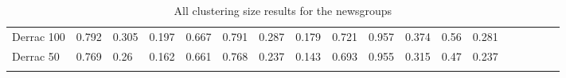 \begin{landscape}
\begin{table}[]
\begin{tabular}{lll@{\hskip 0.15in}lllllllllllllll}
		Derrac 100  & 0.792                           & 0.305                           & 0.197                           & 0.667                           & 0.791                           & 0.287                           & 0.179                          & 0.721                           & 0.957                           & 0.374                           & 0.56                            & 0.281               \\
		Derrac 50   & 0.769                           & 0.26                            & 0.162                           & 0.661                           & 0.768                           & 0.237                           & 0.143                          & 0.693                           & 0.955                           & 0.315                           & 0.47                            & 0.237                                     \\
		&                                 &                                 &                                 &                                 &                                 &                                 &                                &                                 &                                 &                                 &                                 &                                                       \\
		
   
	\end{tabular}
\centering
	\caption{All clustering size results for the newsgroups}
\end{table}


\end{landscape}
